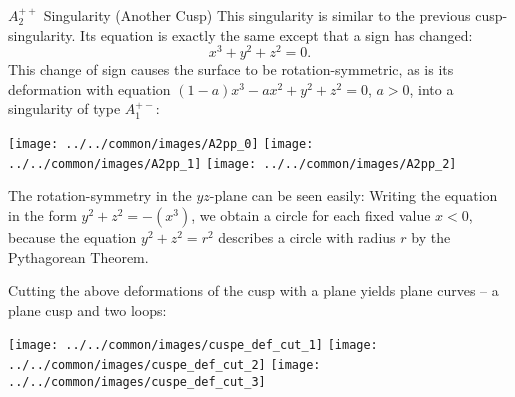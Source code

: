 \begin{surferPage}[A2++ Cusp]{$A_2^{++}$ Singularity (Another Cusp)}
	This singularity is similar to the previous cusp-singularity. Its equation is exactly the same except that a sign has changed:
	\[
		x^3+y^2+z^2=0.
	\]
	This change of sign causes the surface to be rotation-symmetric, as is its deformation with equation $(1-a)x^3-ax^2+y^2+z^2=0$, $a>0$, into a singularity of type $A_1^{+-}$:
	\begin{Centering*}%
		\texttt{[image: ../../common/images/A2pp\_0]}\quad%
		\texttt{[image: ../../common/images/A2pp\_1]}\quad%
		\texttt{[image: ../../common/images/A2pp\_2]}%
	\end{Centering*}
	The rotation-symmetry in the $yz$-plane can be seen easily:
	Writing the equation in the form $y^2+z^2=-(x^3)$, we obtain a circle for each fixed value $x<0$, because the equation $y^2+z^2=r^2$ describes a circle with radius $r$ by the Pythagorean Theorem.

	Cutting the above deformations of the cusp with a plane yields plane curves -- a plane cusp and two loops:
	\begin{Centering*}%
		\texttt{[image: ../../common/images/cuspe\_def\_cut\_1]}\qquad%
		\texttt{[image: ../../common/images/cuspe\_def\_cut\_2]}\qquad%
		\texttt{[image: ../../common/images/cuspe\_def\_cut\_3]}%
	\end{Centering*}
\end{surferPage}
